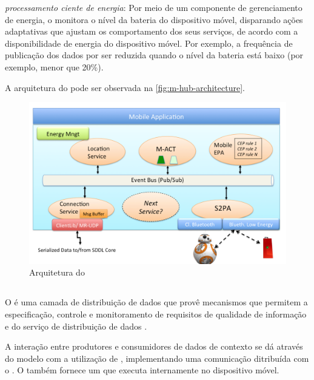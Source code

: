\begin{alineas}
	\item \emph{processamento ciente de energia}:
		Por meio de um componente de gerenciamento de energia, o \mhub monitora o nível da bateria do dispositivo móvel, disparando ações adaptativas que ajustam os comportamento dos seus serviços, de acordo com a disponibilidade de energia do dispositivo móvel. Por exemplo, a frequência de publicação dos dados por ser reduzida quando o nível da bateria está baixo (por exemplo, menor que 20\%).
\end{alineas}

A arquitetura do \middleware pode ser observada na \autoref{fig:m-hub-architecture}.

\begin{figure}[htb]
	\centering
	\caption{\label{fig:m-hub-architecture}Arquitetura do \mhub}
	\includegraphics[scale=0.34]{img/m-hub-architecture.png}
\end{figure}

\subsection{\cddl}

O \cddl é uma camada de distribuição de dados que provê mecanismos que permitem a especificação, controle e monitoramento de requisitos de qualidade de informação e do serviço de distribuição de dados \cite{gomes:2017}.

A interação entre produtores e consumidores de dados de contexto se dá através do modelo \pubsub com a utilização de \brokers, implementando uma comunicação ditribuída com o \mqtt. O \cddl também fornece um \ubroker que executa internamente no dispositivo móvel.

